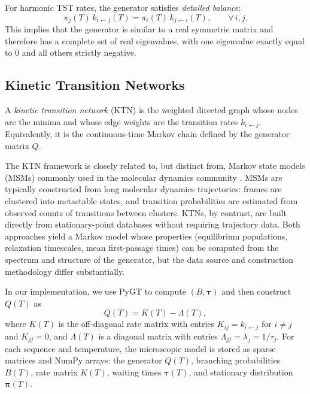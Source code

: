 For harmonic TST rates, the generator satisfies \emph{detailed balance}:
\begin{equation}\label{eq:detailed-balance}
  \pi_j(T)\, k_{i\leftarrow j}(T) = \pi_i(T)\, k_{j\leftarrow i}(T),
  \qquad \forall\, i,j.
\end{equation}
This implies that the generator is similar to a real symmetric matrix and therefore
has a complete set of real eigenvalues, with one eigenvalue exactly equal to $0$ and
all others strictly negative.


\subsection{Kinetic Transition Networks}\label{subsec:ktn-defn}

A \emph{kinetic transition network} (KTN) is the weighted directed graph whose nodes
are the minima and whose edge weights are the transition rates $k_{i\leftarrow j}$.
Equivalently, it is the continuous-time Markov chain defined by the generator matrix
$Q$.

The KTN framework is closely related to, but distinct from, Markov state models (MSMs)
commonly used in the molecular dynamics community \cite{Pande2010MSMReview,Noe2013MSMReview}.
MSMs are typically constructed from long molecular dynamics trajectories: frames are
clustered into metastable states, and transition probabilities are estimated from observed
counts of transitions between clusters. KTNs, by contrast, are built directly from
stationary-point databases without requiring trajectory data. Both approaches yield a
Markov model whose properties (equilibrium populations, relaxation timescales, mean
first-passage times) can be computed from the spectrum and structure of the generator,
but the data source and construction methodology differ substantially.

In our implementation, we use PyGT to compute $(B,\boldsymbol{\tau})$ and then
construct $Q(T)$ as
\begin{equation}\label{eq:Q-construction}
  Q(T) = K(T) - \Lambda(T),
\end{equation}
where $K(T)$ is the off-diagonal rate matrix with entries $K_{ij} = k_{i\leftarrow j}$
for $i\neq j$ and $K_{jj} = 0$, and $\Lambda(T)$ is a diagonal matrix with entries
$\Lambda_{jj} = \lambda_j = 1/\tau_j$. For each sequence and temperature, the
microscopic model is stored as sparse matrices and NumPy arrays: the generator
$Q(T)$, branching probabilities $B(T)$, rate matrix $K(T)$, waiting times
$\boldsymbol{\tau}(T)$, and stationary distribution $\boldsymbol{\pi}(T)$.

